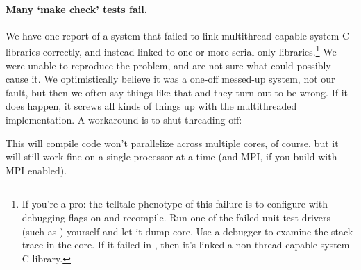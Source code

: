 \paragraph{Many `make check' tests fail.} We have one report of a
system that failed to link multithread-capable system C libraries
correctly, and instead linked to one or more serial-only
libraries.\footnote{If you're a pro: the telltale phenotype of this
  failure is to configure with debugging flags on and recompile. Run
  one of the failed unit test drivers (such as
  ) yourself and let it dump core. Use a
  debugger to examine the stack trace in the core. If it failed in
  , then it's linked a non-thread-capable
  system C library.} We were unable to reproduce the problem, and are
not sure what could possibly cause it. We optimistically believe it
was a one-off messed-up system, not our fault, but then we often say
things like that and they turn out to be wrong. If it does happen, it
screws all kinds of things up with the multithreaded implementation. A
workaround is to shut threading off:

  \vspace{1ex}
  \vspace{1ex}

This will compile code won't parallelize across multiple cores, of
course, but it will still work fine on a single processor at a time
(and MPI, if you build with MPI enabled).

